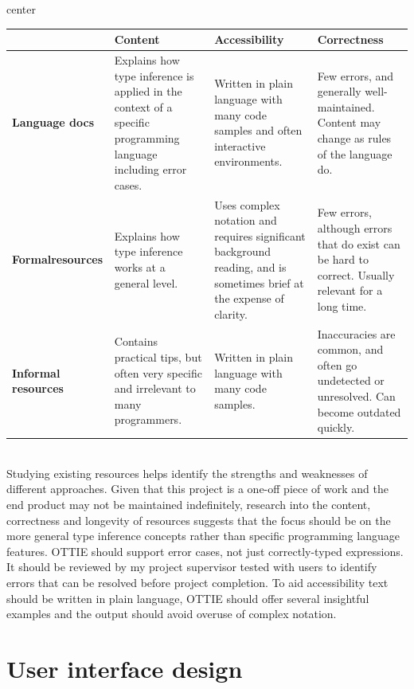 \documentclass[a4paper,fleqn,oneside,12pt]{report}
\begin{document}
\begin{adjustbox}{center}\begin{tabularx}{1.2\textwidth}{ |p{2cm}|X|X|X| }
  \hline
   & \textbf{Content} & \textbf{Accessibility} & \textbf{Correctness} \\
  \hline
  \textbf{Language docs} & Explains how type inference is applied in the context of a specific programming language including error cases. & Written in plain language with many code samples and often interactive environments. & Few errors, and generally well-maintained. Content may change as rules of the language do. \\
  \hline
  \textbf{Formal\newline resources} & Explains how type inference works at a general level. & Uses complex notation and requires significant background reading, and is sometimes brief at the expense of clarity. & Few errors, although errors that do exist can be hard to correct. Usually relevant for a long time. \\
  \hline
  \textbf{Informal resources} & Contains practical tips, but often very specific and irrelevant to many programmers. & Written in plain language with many code samples. & Inaccuracies are common, and often go undetected or unresolved. Can become outdated quickly. \\
  \hline
\end{tabularx}\end{adjustbox}\\

Studying existing resources helps identify the strengths and weaknesses of different approaches. Given that this project is a one-off piece of work and the end product may not be maintained indefinitely, research into the content, correctness and longevity of resources suggests that the focus should be on the more general type inference concepts rather than specific programming language features. OTTIE should support error cases, not just correctly-typed expressions. It should be reviewed by my project supervisor tested with users to identify errors that can be resolved before project completion. To aid accessibility text should be written in plain language, OTTIE should offer several insightful examples and the output should avoid overuse of complex notation.

\section{User interface design}
\end{document}
